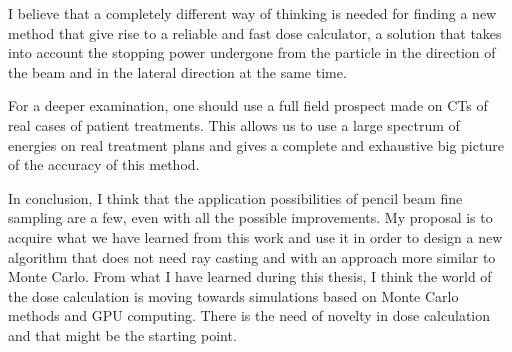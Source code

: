 \documentclass[12pt, a4paper, twoside]{book}
\begin{document}
I believe that a completely different way of thinking is needed for finding a new method that give rise to a reliable and fast dose calculator, a solution that takes into account the stopping power undergone from the particle in the direction of the beam and in the lateral direction at the same time. 

For a deeper examination, one should use a full field prospect made on CTs of real cases of patient treatments. This allows us to use a large spectrum of energies on real treatment plans and gives a complete and exhaustive big picture of the accuracy of this method.

In conclusion, I think that the application possibilities of pencil beam fine sampling are a few, even with all the possible improvements. My proposal is to acquire what we have learned from this work and use it in order to design a new algorithm that does not need ray casting and with an approach more similar to Monte Carlo. From what I have learned during this thesis, I think the world of the dose calculation is moving towards simulations based on Monte Carlo methods and GPU computing. There is the need of novelty in dose calculation and that might be the starting point.



\listoffigures
\listoftables
\end{document}
